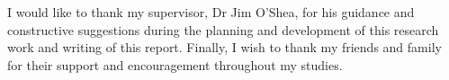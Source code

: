 %
%
\tocless{}
\vspace{6mm}
\begin{center}
\begin{minipage}{13cm}
    I would like to thank my supervisor, Dr Jim O'Shea, for his guidance and constructive suggestions during the planning and development of this research work and writing of this report. Finally, I wish to thank my friends and family for their support and encouragement throughout my studies.
\end{minipage}
\end{center}